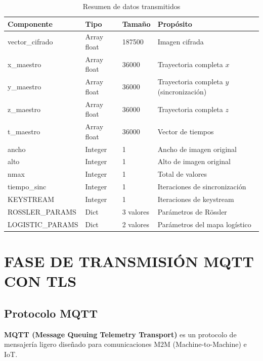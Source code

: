 \documentclass[12pt,a4paper]{article}
\begin{document}
\begin{table}[H]
\centering
\caption{Resumen de datos transmitidos}
\label{tab:payload}
\small
\begin{tabular}{@{}llll@{}}
\toprule
\textbf{Componente} & \textbf{Tipo} & \textbf{Tamaño} & \textbf{Propósito} \\ \midrule
vector\_cifrado & Array float & 187500 & Imagen cifrada \\
x\_maestro & Array float & 36000 & Trayectoria completa $x$ \\
y\_maestro & Array float & 36000 & Trayectoria completa $y$ (sincronización) \\
z\_maestro & Array float & 36000 & Trayectoria completa $z$ \\
t\_maestro & Array float & 36000 & Vector de tiempos \\
ancho & Integer & 1 & Ancho de imagen original \\
alto & Integer & 1 & Alto de imagen original \\
nmax & Integer & 1 & Total de valores \\
tiempo\_sinc & Integer & 1 & Iteraciones de sincronización \\
KEYSTREAM & Integer & 1 & Iteraciones de keystream \\
ROSSLER\_PARAMS & Dict & 3 valores & Parámetros de Rössler \\
LOGISTIC\_PARAMS & Dict & 2 valores & Parámetros del mapa logístico \\ \bottomrule
\end{tabular}
\end{table}

\section{FASE DE TRANSMISIÓN MQTT CON TLS}

\subsection{Protocolo MQTT}

\textbf{MQTT (Message Queuing Telemetry Transport)} es un protocolo de mensajería ligero diseñado para comunicaciones M2M (Machine-to-Machine) e IoT.
\end{document}

